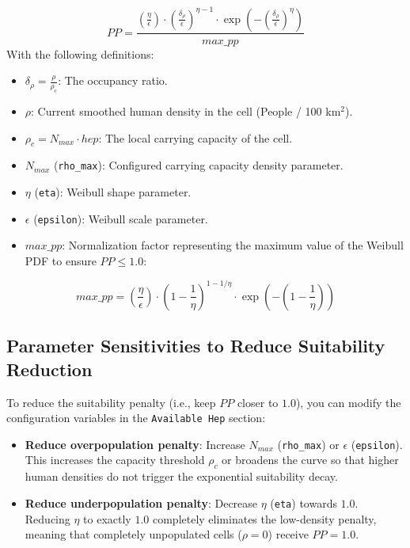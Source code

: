 \documentclass[11pt,a4paper]{report}
\begin{document}
\begin{equation}
    PP = \frac{ \left( \frac{\eta}{\epsilon} \right) \cdot \left( \frac{\delta_{\rho}}{\epsilon} \right)^{\eta - 1} \cdot \exp\left( - \left( \frac{\delta_{\rho}}{\epsilon} \right)^{\eta} \right) }{ max\_pp }
\end{equation}
With the following definitions:
\begin{itemize}
    \item $\delta_{\rho} = \frac{\rho}{\rho_c}$: The occupancy ratio.
    \item $\rho$: Current smoothed human density in the cell (People / 100 km$^2$).
    \item $\rho_c = N_{max} \cdot hep$: The local carrying capacity of the cell.
    \item $N_{max}$ (\texttt{rho\_max}): Configured carrying capacity density parameter.
    \item $\eta$ (\texttt{eta}): Weibull shape parameter.
    \item $\epsilon$ (\texttt{epsilon}): Weibull scale parameter.
    \item $max\_pp$: Normalization factor representing the maximum value of the Weibull PDF to ensure $PP \le 1.0$:
\end{itemize}

\begin{equation}
    max\_pp = \left( \frac{\eta}{\epsilon} \right) \cdot \left( 1 - \frac{1}{\eta} \right)^{1 - 1/\eta} \cdot \exp\left( - \left( 1 - \frac{1}{\eta} \right) \right)
\end{equation}

\subsection{Parameter Sensitivities to Reduce Suitability Reduction}
To reduce the suitability penalty (i.e., keep $PP$ closer to $1.0$), you can modify the configuration variables in the \texttt{Available Hep} section:
\begin{itemize}
    \item \textbf{Reduce overpopulation penalty}: Increase $N_{max}$ (\texttt{rho\_max}) or $\epsilon$ (\texttt{epsilon}). This increases the capacity threshold $\rho_c$ or broadens the curve so that higher human densities do not trigger the exponential suitability decay.
    \item \textbf{Reduce underpopulation penalty}: Decrease $\eta$ (\texttt{eta}) towards $1.0$. Reducing $\eta$ to exactly $1.0$ completely eliminates the low-density penalty, meaning that completely unpopulated cells ($\rho = 0$) receive $PP = 1.0$.
\end{itemize}
\end{document}
